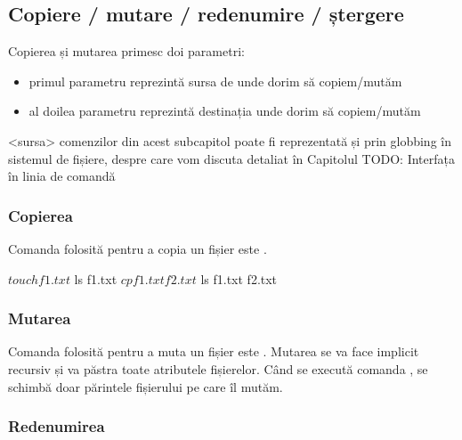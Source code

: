 \subsection{Copiere / mutare / redenumire / ștergere}
\label{sec:file-system-file-cp-mv-rm}

Copierea și mutarea primesc doi parametri:

\begin{itemize}
	\item primul parametru reprezintă sursa de unde dorim să copiem/mutăm
	\item al doilea parametru reprezintă destinația unde dorim să copiem/mutăm
\end{itemize}

\begin{note}[Observație]
<sursa> comenzilor din acest subcapitol poate fi reprezentată și
prin globbing în sistemul de fișiere, despre care vom discuta detaliat în Capitolul TODO: Interfața în linia de comandă
\end{note}

\subsubsection{Copierea}
\label{sec:file-system-file-cp}

Comanda folosită pentru a copia un fișier este .

\begin{screen}
$ touch f1.txt
$ ls
f1.txt
$ cp f1.txt f2.txt
$ ls
f1.txt  f2.txt
\end{screen}

\subsubsection{Mutarea}
\label{sec:file-system-file-mv}

Comanda folosită pentru a muta un fișier este . Mutarea se va face implicit recursiv și va păstra toate
atributele fișierelor. Când se execută comanda , se schimbă doar
părintele fișierului pe care îl mutăm.


\subsubsection{Redenumirea}
\label{sec:file-system-file-rename}

